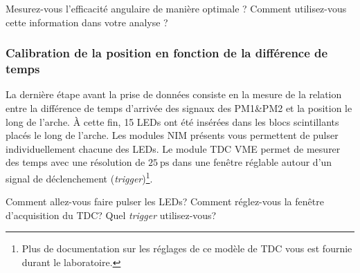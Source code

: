 Mesurez-vous l'efficacité angulaire de manière optimale ?
Comment utilisez-vous cette information dans votre analyse ?


\subsubsection{Calibration de la position en fonction de la différence de temps}

La dernière étape avant la prise de données consiste en la mesure de la relation entre la différence de temps d'arrivée des signaux des PM1\&PM2 et la position le long de l'arche.
À cette fin, 15 LEDs ont été insérées dans les blocs scintillants placés le long de l'arche.
Les modules NIM présents vous permettent de pulser individuellement chacune des LEDs.
Le module TDC VME permet de mesurer des temps avec une résolution de \(\SI{25}{\ps}\) dans une fenêtre réglable autour d'un signal de déclenchement (\textit{trigger})\footnote{Plus de documentation sur les réglages de ce modèle de TDC vous est fournie durant le laboratoire.}.

Comment allez-vous faire pulser les LEDs?
Comment réglez-vous la fenêtre d'acquisition du TDC?
Quel \textit{trigger} utilisez-vous?

